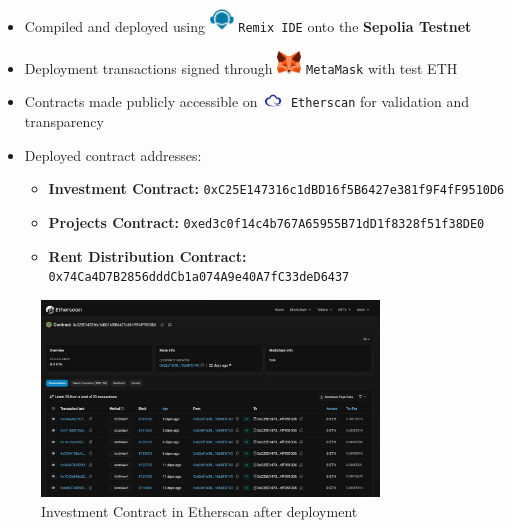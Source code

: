 \begin{itemize}
    \item Compiled and deployed using \includegraphics[width=0.05\textwidth]{images/icons/remix.png} \texttt{Remix IDE} onto the \textbf{Sepolia Testnet}
    \item Deployment transactions signed through \includegraphics[width=0.05\textwidth]{images/icons/metamask.png} \texttt{MetaMask} with test ETH
    \item Contracts made publicly accessible on \includegraphics[width=0.05\textwidth]{images/icons/etherscan.png} \texttt{Etherscan} for validation and transparency
    \item Deployed contract addresses:
    \begin{itemize}
        \item \textbf{Investment Contract:} \texttt{0xC25E147316c1dBD16f5B6427e381f9F4fF9510D6}
        \item \textbf{Projects Contract:} \texttt{0xed3c0f14c4b767A65955B71dD1f8328f51f38DE0}
        \item \textbf{Rent Distribution Contract:} \texttt{0x74Ca4D7B2856dddCb1a074A9e40A7fC33deD6437}
    \end{itemize}
\end{itemize}
\newpage
\begin{figure}[htbp]
  \centering
  \includegraphics[width=0.8\textwidth]{images/etherscan_screenshot.png}
  \caption{Investment Contract in Etherscan after deployment}
  \label{fig:etherscan-screenshot}
\end{figure}

